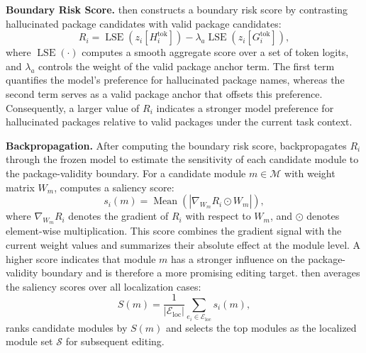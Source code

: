 \noindent{} \textbf{Boundary Risk Score.}
\appname then constructs a boundary risk score by contrasting hallucinated package candidates with valid package candidates:
\begin{equation}
R_i =
\operatorname{LSE}\left(z_i[H_i^{\mathrm{tok}}]\right)
-
\lambda_a
\operatorname{LSE}\left(z_i[G_i^{\mathrm{tok}}]\right),
\end{equation}
where $\operatorname{LSE}(\cdot)$ computes a smooth aggregate score over a set of token logits, and $\lambda_a$ controls the weight of the valid package anchor term. The first term quantifies the model’s preference for hallucinated package names, whereas the second term serves as a valid package anchor that offsets this preference. Consequently, a larger value of $R_i$ indicates a stronger model preference for hallucinated packages relative to valid packages under the current task context.

\noindent{} \textbf{Backpropagation.}
After computing the boundary risk score, \appname backpropagates $R_i$ through the frozen model to estimate the sensitivity of each candidate module to the package-validity boundary. For a candidate module $m \in \mathcal{M}$ with weight matrix $W_m$, \appname computes a saliency score:
\begin{equation}
s_i(m)
=
\operatorname{Mean}
\left(
\left|
\nabla_{W_m} R_i
\odot
W_m
\right|
\right),
\end{equation}
where $\nabla_{W_m} R_i$ denotes the gradient of $R_i$ with respect to $W_m$, and $\odot$ denotes element-wise multiplication.
This score combines the gradient signal with the current weight values and summarizes their absolute effect at the module level.
A higher score indicates that module $m$ has a stronger influence on the package-validity boundary and is therefore a more promising editing target.
\appname then averages the saliency scores over all localization cases:
\begin{equation}
S(m)
=
\frac{1}{|\mathcal{E}_{\mathrm{loc}}|}
\sum_{e_i \in \mathcal{E}_{\mathrm{loc}}}
s_i(m),
\end{equation}
\appname ranks candidate modules by $S(m)$ and selects the top modules as the localized module set $\mathcal{S}$ for subsequent editing.


